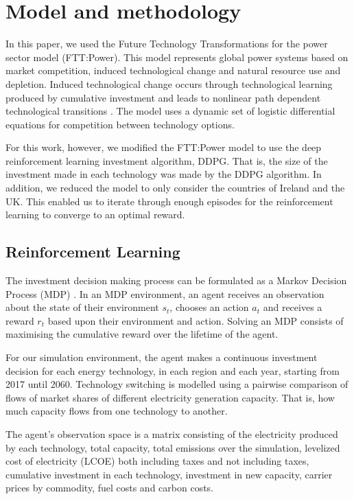 \documentclass{article}
\begin{document}
\section{Model and methodology}
\label{sec:methods}


In this paper, we used the Future Technology Transformations for the power sector  model (FTT:Power). This model represents global power systems based on market competition, induced technological change and natural resource use and depletion. Induced technological change occurs through technological learning produced by cumulative investment and leads to nonlinear path dependent technological transitions \cite{Mercure2012}. The model uses a dynamic set of logistic differential equations for competition between technology options.

For this work, however, we modified the FTT:Power model to use the deep reinforcement learning investment algorithm, DDPG. That is, the size of the investment made in each technology was made by the DDPG algorithm. In addition, we reduced the model to only consider the countries of Ireland and the UK. This enabled us to iterate through enough episodes for the reinforcement learning to converge to an optimal reward.

\subsection*{Reinforcement Learning}

The investment decision making process can be formulated as a Markov Decision Process (MDP) \cite{puterman2014markov}. In an MDP environment, an agent receives an observation about the state of their environment $s_t$, chooses an action $a_t$ and receives a reward $r_t$ based upon their environment and action. Solving an MDP consists of maximising the cumulative reward over the lifetime of the agent. 


For our simulation environment, the agent makes a continuous investment decision for each energy technology, in each region and each year, starting from 2017 until 2060. 	Technology switching is modelled using a pairwise comparison of flows of market shares of different electricity generation capacity. That is, how much capacity flows from one technology to another. 

The agent's observation space is a matrix consisting of the electricity produced by each technology, total capacity, total  emissions over the simulation, levelized cost of electricity (LCOE) both including taxes and not including taxes, cumulative investment in each technology, investment in new capacity, carrier prices by commodity, fuel costs and carbon costs.
\end{document}
